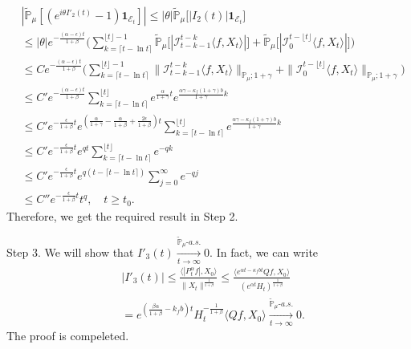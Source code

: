\documentclass[12pt]{amsart}
\theoremstyle{plain}
\theoremstyle{definition}
\numberwithin{equation}{section}
\begin{document}
\begin{align*}
    &|\mathbb{\tilde{P}}_{\mu} [ (e^{i\theta I'_2(t)}-1)\mathbf{1}_{\mathcal{E}_t}]|
    \leq |\theta| \mathbb{\tilde{P}}_{\mu} \big[ |I_2(t)|\mathbf{1}_{\mathcal{E}_t}\big]
    \\&\leq|\theta| e^{-\frac{(\alpha - \epsilon )t}{1+\beta}} \Big(\sum_{k=\lceil t-\ln t \rceil}^{\lfloor t \rfloor - 1}\mathbb{\tilde{P}}_{\mu}\big[| \mathcal{I}_{t-k-1}^{t-k}\langle f,X_t\rangle|\big] + \mathbb{\tilde{P}}_{\mu}\big[| \mathcal{I}_{0}^{t-\lfloor t\rfloor}\langle f,X_t\rangle|\big]\Big)
    \\& \leq C  e^{-\frac{(\alpha - \epsilon )t}{1+\beta}} \Big(\sum_{k=\lceil t-\ln t \rceil}^{\lfloor t \rfloor - 1}\|\mathcal{I}_{t-k-1}^{t-k}\langle f,X_t\rangle\|_{\mathbb P_\mu; 1+\gamma} + \|\mathcal I_0^{t-\lfloor t \rfloor} \langle f, X_t\rangle\|_{\mathbb P_\mu;1+\gamma}\Big)
    \\ &\leq C'  e^{-\frac{(\alpha - \epsilon )t}{1+\beta}} \sum_{k=\lceil t-\ln t \rceil}^{\lfloor t \rfloor}e^{\frac{\alpha}{1+\gamma}t}e^{\frac{\alpha\gamma-\kappa_f(1+\gamma)b}{1+\gamma}k}\\
    &\leq C'  e^{-\frac{\epsilon}{1+\beta} t}e^{(\frac{\alpha }{1+\gamma}-\frac{\alpha }{1+\beta} + \frac{2\epsilon}{1+\beta})t} \sum_{k=\lceil t-\ln t \rceil}^{\lfloor t \rfloor}e^{\frac{\alpha\gamma-\kappa_f(1+\gamma)b}{1+\gamma}k}\\
    &\leq C'  e^{-\frac{\epsilon}{1+\beta} t} e^{qt} \sum_{k=\lceil t-\ln t \rceil}^{\lfloor t \rfloor}e^{-qk}\\
    &\leq C'  e^{-\frac{\epsilon}{1+\beta} t} e^{q(t - \lceil t - \ln t\rceil)} \sum_{j=0}^{\infty}e^{-qj}\\
    &\leq C'' e^{-\frac{\epsilon}{1+\beta} t} t^q,
    \quad t\geq t_0.
\end{align*}
	Therefore, we get the required result in Step 2.

	Step 3. We will show that $I'_3(t) \xrightarrow[t\to \infty]{\tilde {\mathbb P}_\mu \text{-} a.s.} 0$. 
	In fact, we can write
\begin{align}
	&|I'_3(t)| 
	\leq \frac{\langle |P^\alpha_tf|,X_0\rangle}{\|X_t\|^{\frac{1}{1+\beta}}}
	\leq \frac{\langle e^{\alpha t - \kappa_f b t}Qf,X_0\rangle}{(e^{\alpha t} H_t)^{\frac{1}{1+\beta}}}
	\\& = e^{(\frac{\beta \alpha }{1+\beta} - k_fb)t} H_t^{-\frac{1}{1+\beta}} \langle Qf,X_0\rangle
	\xrightarrow[t\to \infty]{\tilde {\mathbb P}_\mu \text{-} a.s.} 0.
\end{align}
	The proof is compeleted.
\end{document}
